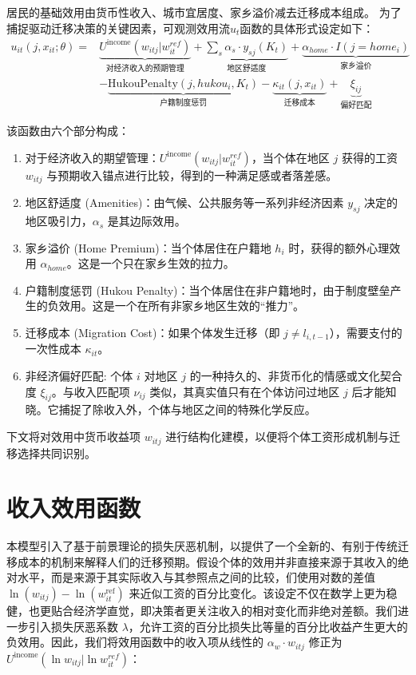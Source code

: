 \documentclass[
  a4paper,
  zihao=-4,
  fontset=mac,
  AutoFakeBold,
  AutoFakeSlant,
  oneside]{ctexbook}
\begin{document}
居民的基础效用由货币性收入、城市宜居度、家乡溢价减去迁移成本组成。
为了捕捉驱动迁移决策的关键因素，可观测效用流$u_t$函数的具体形式设定如下：
\begin{equation}
\begin{split}
     u_{it}(j, x_{it}; \theta) = & \underbrace{ U^{\text{income}}(w_{itj} | w_{it}^{ref}) }_{\text{对经济收入的预期管理}} + \underbrace{\sum_s \alpha_s \cdot y_{sj}(K_t)}_{\text{地区舒适度}} + \underbrace{\alpha_{home} \cdot I(j=home_i)}_{\text{家乡溢价}} \\
    & - \underbrace{\text{HukouPenalty}(j, hukou_i, K_t)}_{\text{户籍制度惩罚}} - \underbrace{\kappa_{it}(j, x_{it})}_{\text{迁移成本}} + \underbrace{\xi_{ij}}_{\text{偏好匹配}}
\end{split}
\label{eq:确定性效用函数}
\end{equation}


该函数由六个部分构成：
\begin{enumerate}
  \item 对于经济收入的期望管理：$U^{\text{income}}(w_{itj} | w_{it}^{ref})$，当个体在地区 $j$ 获得的工资 $w_{itj}$ 与预期收入锚点进行比较，得到的一种满足感或者落差感。
  \item 地区舒适度 (Amenities)：由气候、公共服务等一系列非经济因素 $y_{sj}$ 决定的地区吸引力，$\alpha_s$ 是其边际效用。
  \item 家乡溢价 (Home Premium)：当个体居住在户籍地 $h_i$ 时，获得的额外心理效用 $\alpha_{home}$。这是一个只在家乡生效的拉力。
  \item 户籍制度惩罚 (Hukou Penalty)：当个体居住在非户籍地时，由于制度壁垒产生的负效用。这是一个在所有非家乡地区生效的“推力”。
  \item 迁移成本 (Migration Cost)：如果个体发生迁移（即 $j \neq l_{i,t-1}$），需要支付的一次性成本 $\kappa_{it}$。
  \item 非经济偏好匹配: 个体 $i$ 对地区 $j$ 的一种持久的、非货币化的情感或文化契合度 $\xi_{ij}$。与收入匹配项 $\nu_{ij}$ 类似，其真实值只有在个体访问过地区 $j$ 后才能知晓。它捕捉了除收入外，个体与地区之间的特殊化学反应。
\end{enumerate}

下文将对效用中货币收益项 $w_{itj}$ 进行结构化建模，以便将个体工资形成机制与迁移选择共同识别。

\section{收入效用函数}

本模型引入了基于前景理论的损失厌恶机制，以提供了一个全新的、有别于传统迁移成本的机制来解释人们的迁移预期。假设个体的效用并非直接来源于其收入的绝对水平，而是来源于其实际收入与其参照点之间的比较，们使用对数的差值 $\ln(w_{itj}) - \ln(w_{it}^{\text{ref}})$ 来近似工资的百分比变化。该设定不仅在数学上更为稳健，也更贴合经济学直觉，即决策者更关注收入的相对变化而非绝对差额。我们进一步引入损失厌恶系数 $\lambda$，允许工资的百分比损失比等量的百分比收益产生更大的负效用。因此，我们将效用函数中的收入项从线性的 $α_w \cdot w_{itj}$ 修正为 $U^{\text{income}}(\ln w_{itj} | \ln w_{it}^{ref})$：
\end{document}
